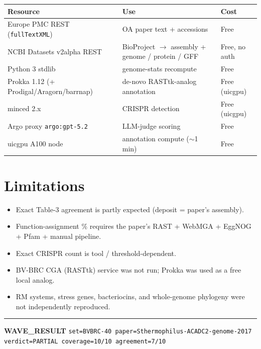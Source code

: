 \documentclass[11pt]{article}
\begin{document}
\begin{longtable}{lll}
\toprule
Resource & Use & Cost \\
\midrule
\endhead
Europe PMC REST (\texttt{fullTextXML}) & OA paper text + accessions & Free \\
NCBI Datasets v2alpha REST & BioProject $\rightarrow$ assembly + genome / protein / GFF & Free, no auth \\
Python 3 stdlib & genome-stats recompute & Free \\
Prokka 1.12 (+ Prodigal/Aragorn/barrnap) & de-novo RASTtk-analog annotation & Free (uicgpu) \\
minced 2.x & CRISPR detection & Free (uicgpu) \\
Argo proxy \texttt{argo:gpt-5.2} & LLM-judge scoring & Free \\
uicgpu A100 node & annotation compute ($\sim$1 min) & Free \\
\bottomrule
\end{longtable}

\section{Limitations}

\begin{itemize}[leftmargin=*, itemsep=2pt]
  \item Exact Table-3 agreement is partly expected (deposit = paper's assembly).
  \item Function-assignment \% requires the paper's RAST + WebMGA + EggNOG + Pfam + manual pipeline.
  \item Exact CRISPR count is tool / threshold-dependent.
  \item BV-BRC CGA (RASTtk) service was not run; Prokka was used as a free local analog.
  \item RM systems, stress genes, bacteriocins, and whole-genome phylogeny were not independently reproduced.
\end{itemize}

\vspace{1em}
\hrule
\vspace{0.5em}
\noindent\textbf{WAVE\_RESULT} \texttt{set=BVBRC-40 paper=Sthermophilus-ACADC2-genome-2017
verdict=PARTIAL coverage=10/10 agreement=7/10}
\end{document}
